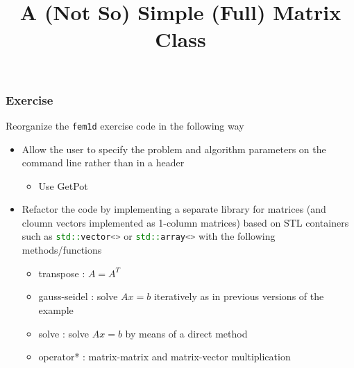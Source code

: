 \documentclass[smaller,a4paper,allowframebreaks]{beamer}
\begin{document}
\title{A (Not So) Simple (Full) Matrix Class}
\frame{\titlepage}

\begin{frame}
\frametitle{Exercise}

Reorganize the {\tt fem1d} exercise code
in the following way
\begin{itemize}
\item Allow the user to specify the problem 
      and algorithm parameters on the command line
      rather than in a header
      \begin{itemize}
      \item Use GetPot
      \end{itemize}      
\item Refactor the code by implementing a separate
      library for matrices (and cloumn vectors 
      implemented as 1-column matrices) based on 
      STL containers such as \lstinline[language=C++]{std::vector<>}
      or \lstinline[language=C++]{std::array<>}
      with the following methods/functions
      \begin{itemize}
      \item transpose : $A = A^{T}$
      \item gauss-seidel : solve $A x = b$ iteratively 
                           as in previous versions of 
                           the example
      \item solve : solve $A x = b$ by means of a direct
                    method
      \item operator* : matrix-matrix and matrix-vector
                        multiplication
      \end{itemize}      
\end{itemize}
\end{frame}
\end{document}
